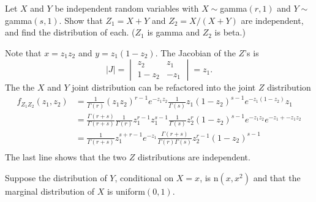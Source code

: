 \documentclass[12pt,letterpaper]{exam}
\begin{document}
\begin{questions}
\begin{solution}
\begin{parts}
			
			\part
			
			
		\end{parts}
	\end{solution}
	\clearpage

	\question
	Let \(X\) and \(Y\) be independent random variables with 
	\(X\sim\)gamma\((r,1)\) and \(Y\sim\)gamma\((s,1)\). 
	Show that \(Z_1 = X + Y\) and \(Z_2 = X/(X + Y )\) are independent, 
	and find the distribution of each. (\(Z_1\) is gamma and \(Z_2\) is beta.) 
	
	\begin{solution}
		Note that \(x = z_1z_2\) and \(y=z_1(1-z_2)\).
		The Jacobian of the \(Z\)'s is
		\[ |J| = \begin{vmatrix} z_2 & z_1 \\ 1 - z_2 & -z_1 \end{vmatrix} = z_1. \]
		The the \(X\) and \(Y\) joint distribution can be refactored into the joint \(Z\) distribution
		\begin{align*}
			f_{Z_1Z_2}(z_1,z_2)
			&= \frac{1}{\Gamma(r)} (z_1z_2)^{r-1} e^{-z_1z_2} \frac{1}{\Gamma(s)} z_1(1-z_2)^{s-1} e^{-z_1(1-z_2)} z_1\\
			&= \frac{\Gamma(r+s)}{\Gamma(r+s)} \frac{1}{\Gamma(r)} z_1^{r-1} z_1^{s-1}
			 \frac{1}{\Gamma(s)} z_2^{r} (1-z_2)^{s-1} e^{-z_1z_2}e^{-z_1+-z_1z_2} \\
			&= \frac{1}{\Gamma(r+s)} z_1^{s+r-1} e^{-z_1} \frac{\Gamma(r+s)}{\Gamma(r)\Gamma(s)} z_2^{r-1} (1-z_2)^{s-1} \\
		\end{align*}
		The last line shows that the two \(Z\) distributions are independent.
	\end{solution}

	\setcounter{question}{29}
	\question 
	Suppose the distribution of \(Y\), conditional on \(X = x\), is n\((x, x^2)\) 
	and that the marginal distribution of \(X\) is uniform\((0, 1)\).
	
	

\end{questions}
\end{document}

